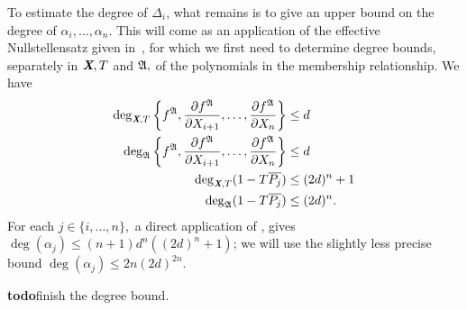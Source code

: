 \documentclass[sigconf]{acmart}
\def\td{{\bf todo}}
\def\Xb{\textit{\textbf{X}}}
\def\pjb{\overline{P_{j}}}
\def\C{\mathbb{C}}
\def\Q{\mathbb{Q}}
\def\D{\Delta}
\def\A{\frak{A}}
\begin{document}
To estimate the degree of $\D_{i}$, what remains is to give an upper
bound on the degree of $\alpha_i,\dots,\alpha_n$. This will come as an
application of the effective Nullstellensatz given in~\cite{EN}, for
which we first need to determine degree bounds, separately in $\Xb,T$
and $\A,$ of the polynomials in the membership relationship. We have
\begin{align*}
\deg_{\Xb,T}\left\{ 
f^\A,\frac{\partial f^\A}{\partial X_{i+1}},\hdots,\frac{\partial f^\A}{\partial X_n}
\right\}&\leq d\\
\deg_{\A}  
\left\{ 
f^\A,\frac{\partial f^\A}{\partial X_{i+1}},\hdots,\frac{\partial f^\A}{\partial X_n}
\right\}& \leq d\\
\deg_{\Xb,T}(1-T\pjb) &\leq (2d)^n +1 \\
\deg_{\A}(1-T\pjb)& \leq (2d)^n.
\end{align*}
For each $j \in \{i,\hdots,n\},$ a direct application of \cite[Theorem
0.5]{EN}, gives $\deg(\alpha_j) \le (n+1)d^n((2d)^n+1)$; we will use
the slightly less precise bound $\deg(\alpha_j) \le 2n(2d)^{2n}$.


\td finish the degree bound.

\end{document}
